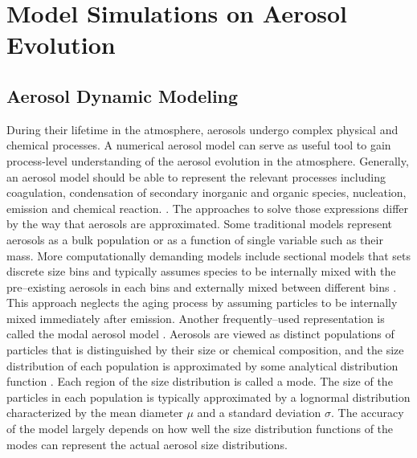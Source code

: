 \documentclass[12pt, fullpage]{uiucthesis2009_2}
\begin{document}
\newpage

	\section{Model Simulations on Aerosol Evolution}
		\subsection{Aerosol Dynamic Modeling}
		During their lifetime in the atmosphere, aerosols undergo complex physical and chemical processes. A numerical aerosol model can serve as useful tool to gain process-level understanding of the aerosol evolution in the atmosphere. Generally, an aerosol model should be able to represent the relevant processes including coagulation, condensation of secondary inorganic and organic species, nucleation, emission and chemical reaction. \citep{whitby1997}. The approaches to solve those expressions differ by the way that aerosols are approximated. Some traditional models represent aerosols as a bulk population or as a function of single variable such as their mass. More computationally demanding models include sectional models that sets discrete size bins and typically assumes species to be internally mixed with the pre--existing aerosols in each bins and externally mixed between different bins \citep[][]{jacobson2001strong,adams1999global}. This approach neglects the aging process by assuming particles to be internally mixed immediately after emission. Another frequently--used representation is called the modal aerosol model \citep[][]{whitby1997,Binkowski1995}. Aerosols are viewed as distinct populations of particles that is distinguished by their size or chemical composition, and the size distribution of each population is approximated by some analytical distribution function \citep{Binkowski1995}. Each region of the size distribution is called a mode. The size of the particles in each population is typically approximated by a lognormal distribution characterized by the mean diameter $\mu$ and a standard deviation $\sigma$. The accuracy of the model largely depends on how well the size distribution functions of the modes can represent the actual aerosol size distributions.  
		
\end{document}
